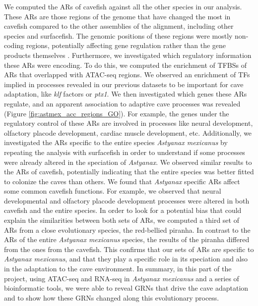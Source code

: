 We computed the ARs of cavefish against all the other species in our analysis. These ARs are those regions of the genome that have changed the most in cavefish compared to the other assemblies of the alignment, including other species and surfacefish. The genomic positions of these regions were mostly non-coding regions, potentially affecting gene regulation rather than the gene products themselves \parencite{leclercq_evolution_2022}. Furthermore, we investigated which regulatory information these ARs were encoding. To do this, we computed the enrichment of TFBSs of ARs that overlapped with ATAC-seq regions. We observed an enrichment of TFs implied in processes revealed in our previous datasets to be important for cave adaptation, like \textit{klf} factors or \textit{ptx1}. We then investigated which genes these ARs regulate, and an apparent association to adaptive cave processes was revealed (Figure \ref{fig:astmex_acc_regions_GO}). For example, the genes under the regulatory control of these ARs are involved in processes like neural development, olfactory placode development, cardiac muscle development, etc. Additionally, we investigated the ARs specific to the entire species \textit{Astyanax mexicanus} by repeating the analysis with surfacefish in order to understand if some processes were already altered in the speciation of \textit{Astyanax}. We observed similar results to the ARs of cavefish, potentially indicating that the entire species was better fitted to colonize the caves than others. We found that \textit{Astyanax} specific ARs affect some common cavefish functions. For example, we observed that neural developmental and olfactory placode development processes were altered in both cavefish and the entire species. In order to look for a potential bias that could explain the similarities between both sets of ARs, we computed a third set of ARs from a close evolutionary species, the red-bellied piranha. In contrast to the ARs of the entire \textit{Astyanax mexicanus} species, the results of the piranha differed from the ones from the cavefish. This confirms that our sets of ARs are specific to \textit{Astyanax mexicanus}, and that they play a specific role in its speciation and also in the adaptation to the cave environment. 
In summary, in this part of the project, using ATAC-seq and RNA-seq in \textit{Astyanax mexicanus} and a series of bioinformatic tools, we were able to reveal GRNs that drive the cave adaptation and to show how these GRNs changed along this evolutionary process.

